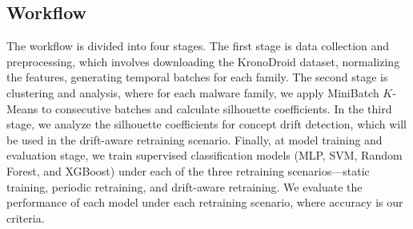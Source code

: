 \documentclass[12pt]{article}
\begin{document}
\begin{table}[!htb]
\centering
\caption{Development environment and libraries}
\label{tab:development_environment}
\end{table}

\subsection{Workflow}

The workflow is divided into four stages. 
The first stage is data collection and preprocessing, which involves downloading the KronoDroid dataset, 
normalizing the features, generating temporal batches for each family.
The second stage is clustering and analysis, where for each malware family, 
we apply MiniBatch $K$-Means to consecutive batches and calculate silhouette coefficients.
In the third stage, we analyze the silhouette coefficients for concept drift detection,
which will be used in the drift-aware retraining scenario. Finally, at model training and evaluation stage, 
we train supervised classification models (MLP, SVM, Random Forest, and XGBoost) 
under each of the three retraining scenarios---static training, periodic retraining, and drift-aware retraining. 
We evaluate the performance of each model under each retraining scenario, where
accuracy is our criteria.
\end{document}
